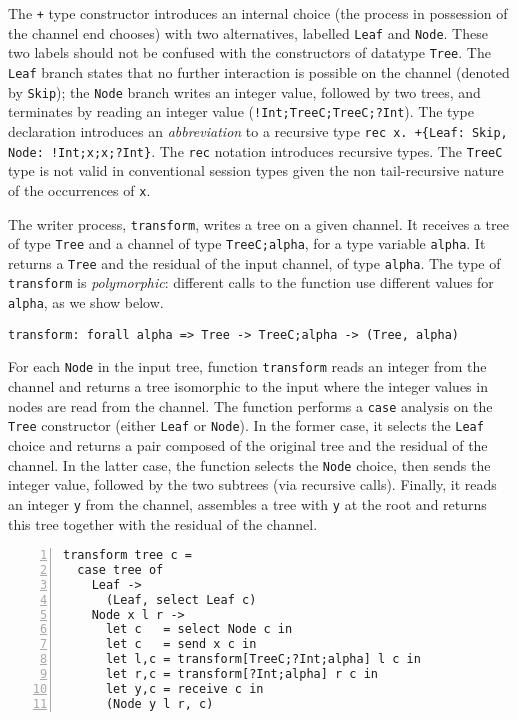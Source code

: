 The \lstinline|+| type constructor introduces an internal choice (the
process in possession of the channel end chooses) with two
alternatives, labelled \lstinline|Leaf| and \lstinline|Node|. These
two labels should not be confused with the constructors of datatype
\lstinline|Tree|. The \lstinline|Leaf| branch states that no further
interaction is possible on the channel (denoted by \lstinline|Skip|);
the \lstinline|Node| branch writes an integer value, followed by two
trees, and terminates by reading an integer value
(\lstinline|!Int;TreeC;TreeC;?Int|).
%
The type declaration introduces an \emph{abbreviation} to a recursive
type \lstinline|rec x. +{Leaf: Skip, Node: !Int;x;x;?Int}|.
%
The \lstinline|rec| notation introduces recursive types. The
\lstinline|TreeC| type is not valid in conventional session types
given the non tail-recursive nature of the occurrences of
\lstinline|x|.


The writer process, \lstinline|transform|, writes a tree on a given
channel. It receives a tree of type \lstinline|Tree|  and a channel
of type \lstinline|TreeC;alpha|, for a type variable
\lstinline|alpha|. It returns a \lstinline|Tree| and the residual of
the input channel, of type \lstinline|alpha|. The type of
\lstinline|transform| is \emph{polymorphic}: different calls to the
function use different values for \lstinline|alpha|, as we show below.

\begin{lstlisting}
transform: forall alpha => Tree -> TreeC;alpha -> (Tree, alpha)
\end{lstlisting}

For each \lstinline|Node| in the input tree, function
\lstinline|transform| reads an integer from the channel and returns a
tree isomorphic to the input where the integer values in nodes are
read from the channel.
%
The function performs a \lstinline|case| analysis on the
\lstinline|Tree| constructor (either \lstinline|Leaf| or
\lstinline|Node|). In the former case, it selects the \lstinline|Leaf|
choice and returns a pair composed of the original tree and the
residual of the channel. In the latter case, the function selects the
\lstinline|Node| choice, then sends the integer value, followed by the
two subtrees (via recursive calls). Finally, it reads an integer
\lstinline|y| from the channel, assembles a tree with \lstinline|y| at
the root and returns this tree together with the residual of the
channel.
%
\begin{lstlisting}[numbers=left]
transform tree c =
  case tree of
    Leaf ->
      (Leaf, select Leaf c)
    Node x l r ->
      let c   = select Node c in
      let c   = send x c in
      let l,c = transform[TreeC;?Int;alpha] l c in
      let r,c = transform[?Int;alpha] r c in
      let y,c = receive c in
      (Node y l r, c)
\end{lstlisting}

